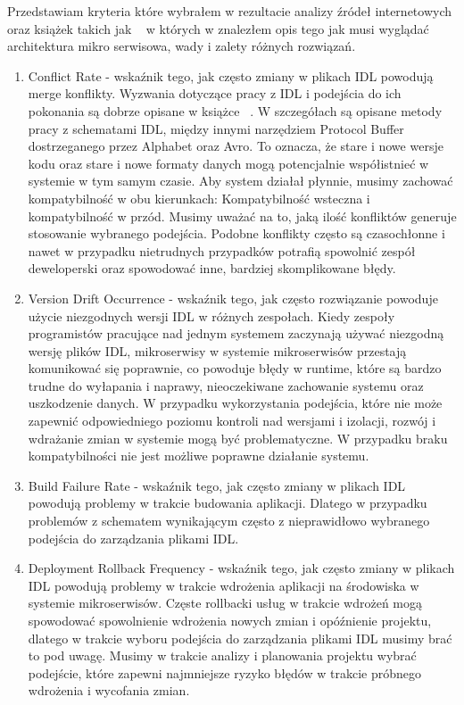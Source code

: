 \documentclass[runningheads,12pt]{llncs}
\begin{document}
Przedstawiam kryteria które wybrałem w rezultacie analizy źródeł internetowych oraz książek takich jak ~\cite{kleppmann2017designing} w których w znalezłem opis tego jak musi wyglądać architektura mikro serwisowa, wady i zalety różnych rozwiązań.

\begin{enumerate}
    \item Conflict Rate - wskaźnik tego, jak często zmiany w plikach IDL powodują merge konflikty. Wyzwania dotyczące pracy z IDL i podejścia do ich pokonania są dobrze opisane w książce ~\cite{kleppmann2017designing}. W szczegółach są opisane metody pracy z schematami IDL, między innymi narzędziem Protocol Buffer dostrzeganego przez Alphabet oraz Avro. To oznacza, że stare i nowe wersje kodu oraz stare i nowe formaty danych mogą potencjalnie współistnieć w systemie w tym samym czasie. Aby system działał płynnie, musimy zachować kompatybilność w obu kierunkach: Kompatybilność wsteczna i kompatybilność w przód. 
    Musimy uważać na to, jaką ilość konfliktów generuje stosowanie wybranego podejścia. Podobne konflikty często są czasochłonne i nawet w przypadku nietrudnych przypadków potrafią spowolnić zespół deweloperski oraz spowodować inne, bardziej skomplikowane błędy. ~\cite[p. 112]{kleppmann2017designing}
    \item Version Drift Occurrence - wskaźnik tego, jak często rozwiązanie powoduje użycie niezgodnych wersji IDL w różnych zespołach. Kiedy zespoły programistów pracujące nad jednym systemem zaczynają używać niezgodną wersję plików IDL, mikroserwisy w systemie mikroserwisów przestają komunikować się poprawnie, co powoduje błędy w runtime, które są bardzo trudne do wyłapania i naprawy, nieoczekiwane zachowanie systemu oraz uszkodzenie danych. W przypadku wykorzystania podejścia, które nie może zapewnić odpowiedniego poziomu kontroli nad wersjami i izolacji, rozwój i wdrażanie zmian w systemie mogą być problematyczne. 
    W przypadku braku kompatybilności nie jest możliwe poprawne działanie systemu. ~\cite[p. 123]{kleppmann2017designing}
    \item Build Failure Rate - wskaźnik tego, jak często zmiany w plikach IDL powodują problemy w trakcie budowania aplikacji.  
    Dlatego w przypadku problemów z schematem wynikającym często z nieprawidłowo wybranego podejścia do zarządzania plikami IDL. ~\cite[p. 123]{kleppmann2017designing}
    \item Deployment Rollback Frequency - wskaźnik tego, jak często zmiany w plikach IDL powodują problemy w trakcie wdrożenia aplikacji na środowiska w systemie mikroserwisów. 
    Częste rollbacki usług w trakcie wdrożeń mogą spowodować spowolnienie wdrożenia nowych zmian i opóźnienie projektu, dlatego w trakcie wyboru podejścia do zarządzania plikami IDL musimy brać to pod uwagę. Musimy w trakcie analizy i planowania projektu wybrać podejście, które zapewni najmniejsze ryzyko błędów w trakcie próbnego wdrożenia i wycofania zmian. ~\cite[p. 92]{kleppmann2017designing}
\end{enumerate}
    
\end{document}
